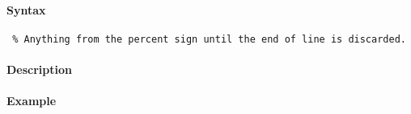 


	\paragraph{Syntax}
 
 \begin{verbatim}
 % Anything from the percent sign until the end of line is discarded.
 \end{verbatim}
 
 \paragraph{Description}
 
 \paragraph{Example}


